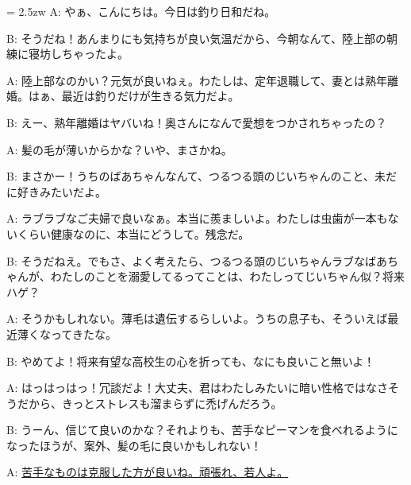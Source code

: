 \documentclass[11pt]{amsart}
\title{}
\author{}
\newenvironment{hangall}[1]{\hangindent = 2.5zw\everypar{\hangindent = 2.5zw}}{}
\begin{document}
\maketitle
\begin{hangall}{}%
A: やぁ、こんにちは。今日は釣り日和だね。

B: そうだね！あんまりにも気持ちが良い気温だから、今朝なんて、陸上部の朝練に寝坊しちゃったよ。

A: 陸上部なのかい？元気が良いねぇ。わたしは、定年退職して、妻とは熟年離婚。はぁ、最近は釣りだけが生きる気力だよ。

B: えー、熟年離婚はヤバいね！奥さんになんで愛想をつかされちゃったの？

A: 髪の毛が薄いからかな？いや、まさかね。

B: まさかー！うちのばあちゃんなんて、つるつる頭のじいちゃんのこと、未だに好きみたいだよ。

A: ラブラブなご夫婦で良いなぁ。本当に羨ましいよ。わたしは虫歯が一本もないくらい健康なのに、本当にどうして。残念だ。

B: そうだねえ。でもさ、よく考えたら、つるつる頭のじいちゃんラブなばあちゃんが、わたしのことを溺愛してるってことは、わたしってじいちゃん似？将来ハゲ？

A: そうかもしれない。薄毛は遺伝するらしいよ。うちの息子も、そういえば最近薄くなってきたな。

B: やめてよ！将来有望な高校生の心を折っても、なにも良いこと無いよ！

A: はっはっはっ！冗談だよ！大丈夫、君はわたしみたいに暗い性格ではなさそうだから、きっとストレスも溜まらずに禿げんだろう。

B: うーん、信じて良いのかな？それよりも、苦手なピーマンを食べれるようになったほうが、案外、髪の毛に良いかもしれない！

A: \ul{苦手なものは克服した方が良いね。頑張れ、若人よ。}\end{hangall}
\end{document}
